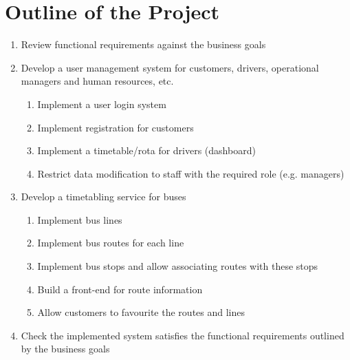 \section{Outline of the Project}

\begin{enumerate}
  \item Review functional requirements against the business goals
  \item Develop a user management system for customers, drivers,
  operational managers and human resources, etc.
  \begin{enumerate}
    \item Implement a user login system
    \item Implement registration for customers
    \item Implement a timetable/rota for drivers (dashboard)
    \item Restrict data modification to staff with the required role
    (e.g. managers)
  \end{enumerate}
  \item Develop a timetabling service for buses
  \begin{enumerate}
    \item Implement bus lines
    \item Implement bus routes for each line
    \item Implement bus stops and allow associating routes with
    these stops
    \item Build a front-end for route information
    \item Allow customers to favourite the routes and lines
  \end{enumerate}
  \item Check the implemented system satisfies the functional
  requirements outlined by the business goals
\end{enumerate}
